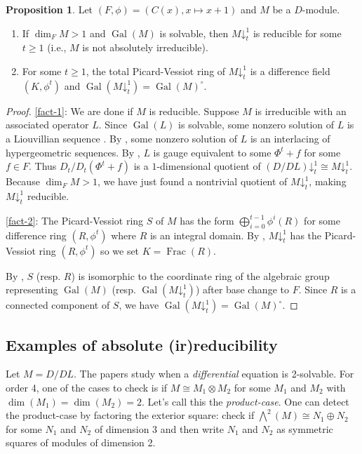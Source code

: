 \documentclass[11pt,reqno]{amsart}
\theoremstyle{definition}
\newtheorem{proposition}[theorem]{Proposition}
\DeclareMathOperator{\Frac}{Frac}
\DeclareMathOperator{\Gal}{Gal}
\newcommand{\pda}{\mathord{\downarrow}}
\begin{document}
\begin{proposition}
    \label{prop:facts} Let $(F,\phi)=(C(x),x\mapsto x+1)$ and $M$ be a $D$-module.
    \begin{enumerate}
        \item \label{fact-1} If $\dim_{F} M>1$ and $\Gal(M)$ is solvable, then $M\pda^{1}_{t}$ is reducible for some $t\ge 1$ (i.e., $M$ is not absolutely irreducible).
        \item \label{fact-2} For some $t\ge 1$, the total Picard-Vessiot ring of $M\pda^{1}_{t}$ is a difference field $(K,\phi^{t})$ and $\Gal(M\pda^{1}_{t})=\Gal(M)^{\circ}$.
    \end{enumerate}
\end{proposition}
\begin{proof}
    \eqref{fact-1}:
    We are done if $M$ is reducible. Suppose $M$ is irreducible with an associated operator $L$.
    Since $\Gal (L)$ is solvable, some nonzero solution of $L$ is a Liouvillian sequence \cite[Theorem 3.4]{hendricks1999solving}. 
    By \cite[Theorem 5.1]{hendricks1999solving}, some nonzero solution of $L$ is an interlacing of hypergeometric sequences. 
    By \cite[Corollary 4.3]{hendricks1999solving}, 
    $L$ is gauge equivalent to some $\Phi^{t}+f$ for some $f\in F$. 
    Thus $D_t/D_t(\Phi^t+f)$ is a $1$-dimensional quotient of $(D/DL)\pda^1_t\cong M\pda^1_t$. Because $\dim_FM>1$, we have just found a nontrivial quotient of $M\pda^1_t$, making $M\pda^1_t$ reducible.

    \eqref{fact-2}: 
    The Picard-Vessiot ring $S$ of $M$ has the form $\bigoplus_{i=0}^{t-1}\phi^{i}(R)$ for some difference ring $(R,\phi^{t})$ where $R$ is an integral domain.
    By \cite[Lemma 1.26]{put2006galois}, $M\pda_{t}^{1}$ has the Picard-Vessiot ring $(R,\phi^{t})$ so we set $K= \Frac(R)$.

    By \cite[Proposition 1.20]{put2006galois}, $S$ (resp. $R$) is isomorphic to the coordinate ring of the algebraic group representing $\Gal(M)$ (resp. $\Gal(M\pda_{t}^{1})$) after base change to $F$. Since $R$ is a connected component of $S$, we have $\Gal(M\pda_{t}^{1})=\Gal (M)^{\circ}$.
\end{proof}

\subsection{Examples of absolute (ir)reducibility} \label{section:6}

Let $M = D/DL$. The papers \cite{ singer1985solving, hessinger2001computing,person2002solving} study when a {\em differential} equation is 2-solvable. For order 4, one of the cases to check is if $M \cong M_1 \otimes M_2$ for some $M_1$ and $M_2$ with $\dim(M_1)=\dim(M_2)=2$. Let's call this the {\em product-case}. One can detect the product-case by factoring the exterior square: check if $\bigwedge^2(M)\cong N_1 \oplus N_2$ for some $N_1$ and $N_2$ of dimension $3$ and then write $N_1$ and $N_2$ as symmetric squares of modules of dimension 2.
\end{document}
